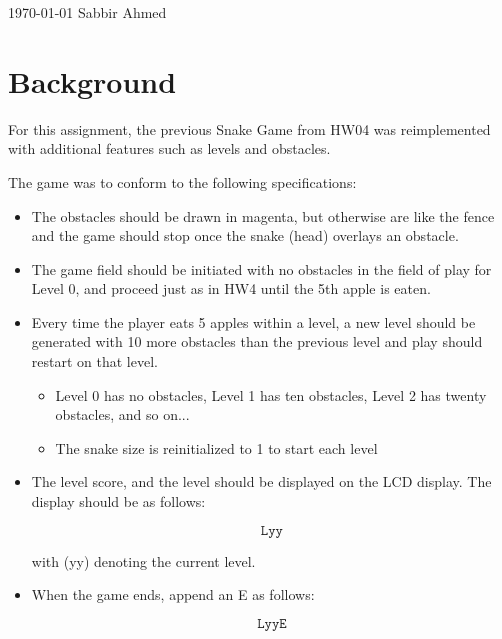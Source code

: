 \documentclass[paper=usletter, fontsize=12pt]{article}
\begin{document}
    {\today} {Sabbir Ahmed}
    \vspace{-0.1in}

    \section{Background} For this assignment, the previous Snake Game from HW04
    was reimplemented with additional features such as levels and obstacles.

    The game was to conform to the following specifications:

        \begin{itemize}

            \item The obstacles should be drawn in magenta, but otherwise are
            like the fence and the game should stop once the snake (head)
            overlays an obstacle.

            \item The game field should be initiated with no obstacles in the
            field of play for Level 0, and proceed just as in HW4 until the 5th
            apple is eaten.

            \item Every time the player eats 5 apples within a level, a new
            level should be generated with 10 more obstacles than the previous
            level and play should restart on that level.

                \begin{itemize}

                    \item Level 0 has no obstacles, Level 1 has ten obstacles,
                    Level 2 has twenty obstacles, and so on...

                    \item The snake size is reinitialized to 1 to start each
                    level

                \end{itemize}

            \item The level score, and the level should be displayed on the LCD
            display. The display should be as follows:

                \[ \texttt{Lyy} \]

                with (yy) denoting the current level.

            \item When the game ends, append an E as follows:

                \[ \texttt{LyyE} \]

        \end{itemize}
\end{document}
